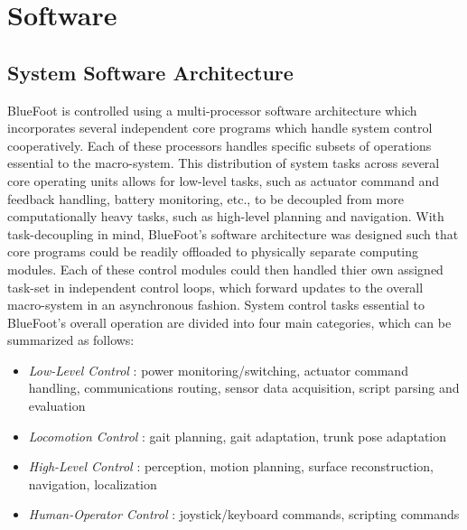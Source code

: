 \label{ch::software}
\chapter{Software}
	
	\section{System Software Architecture}
	
	BlueFoot is controlled using a multi-processor software architecture which incorporates several independent core programs which handle system control cooperatively. Each of these processors handles specific subsets of operations essential to the macro-system. This distribution of system tasks across several core operating units allows for low-level tasks, such as actuator command and feedback handling, battery monitoring, etc., to be decoupled from more computationally heavy tasks, such as high-level planning and navigation. With task-decoupling in mind, BlueFoot's software architecture was designed such that core programs could be readily offloaded to physically separate computing modules. Each of these control modules could then handled thier own assigned task-set in independent control loops, which forward updates to the overall macro-system in an asynchronous fashion. System control tasks essential to BlueFoot's overall operation are divided into four main categories, which can be summarized as follows:
		\begin{itemize}
			\item{
			\emph{Low-Level Control} : 
				power monitoring/switching, 
				actuator command handling, 
				communications routing,
				sensor data acquisition,
				script parsing and evaluation
			}
			\item{
			\emph{Locomotion Control} : 
				gait planning, 
				gait adaptation, 
				trunk pose adaptation
			}
			\item{
			\emph{High-Level Control} : 
				perception, 
				motion planning, 
				surface reconstruction, 
				navigation, 
				localization
			}
			\item{
			\emph{Human-Operator Control} : 
				joystick/keyboard commands,
				scripting commands
			}
		\end{itemize}
